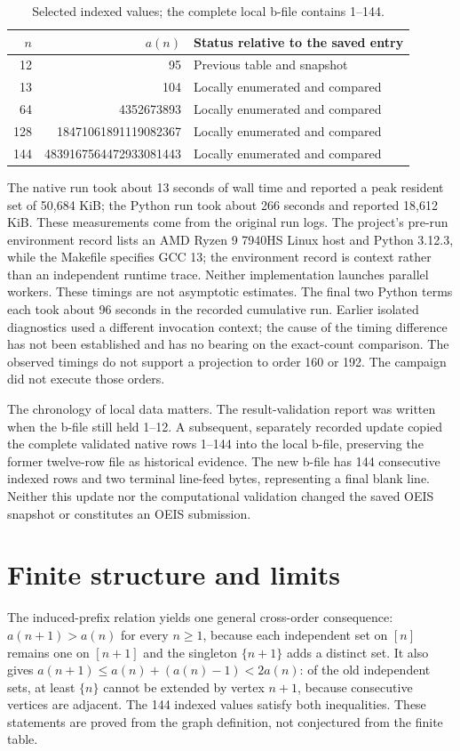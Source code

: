 \documentclass[11pt,a4paper]{article}
\begin{document}
\begin{table}[ht]
\centering
\begin{tabular}{r@{\qquad}r@{\qquad}l}
\toprule
$n$ & $a(n)$ & Status relative to the saved entry \\
\midrule
12 & 95 & Previous table and snapshot \\
13 & 104 & Locally enumerated and compared \\
64 & 4352673893 & Locally enumerated and compared \\
128 & 18471061891119082367 & Locally enumerated and compared \\
144 & 4839167564472933081443 & Locally enumerated and compared \\
\bottomrule
\end{tabular}
\caption{Selected indexed values; the complete local b-file contains 1--144.}
\label{tab:values}
\end{table}

The native run took about 13 seconds of wall time and reported a peak
resident set of 50,684 KiB; the Python run took about 266 seconds and
reported 18,612 KiB.  These measurements come from the original run logs.
The project's pre-run environment record lists an AMD Ryzen 9 7940HS Linux
host and Python 3.12.3, while the Makefile specifies GCC 13; the environment
record is context rather than an independent runtime trace.  Neither
implementation launches parallel workers.  These timings are not asymptotic
estimates.  The final two Python terms each took about 96 seconds in the
recorded cumulative run.  Earlier isolated diagnostics used a different
invocation context; the cause of the timing difference has not been
established and has no bearing on the exact-count comparison.  The observed
timings do not support a
projection to order 160 or 192.  The campaign did not execute those orders.

The chronology of local data matters.  The result-validation report was
written when the b-file still held 1--12.  A subsequent, separately recorded
update copied the complete validated native rows 1--144 into the local
b-file, preserving the former twelve-row file as historical evidence.  The
new b-file has 144 consecutive indexed rows and two terminal line-feed
bytes, representing a final blank line.
Neither this update nor the computational validation changed the saved OEIS
snapshot or constitutes an OEIS submission.

\section{Finite structure and limits}\label{sec:limits}
The induced-prefix relation yields one general cross-order consequence:
$a(n+1)>a(n)$ for every $n\geq1$, because each independent set on $[n]$
remains one on $[n+1]$ and the singleton $\{n+1\}$ adds a distinct set.
It also gives
$a(n+1)\leq a(n)+(a(n)-1)<2a(n)$: of the old independent
sets, at least $\{n\}$ cannot be extended by vertex $n+1$, because
consecutive vertices are adjacent.  The 144 indexed values satisfy both inequalities.
These statements are proved from the graph definition, not conjectured from
the finite table.
\end{document}

